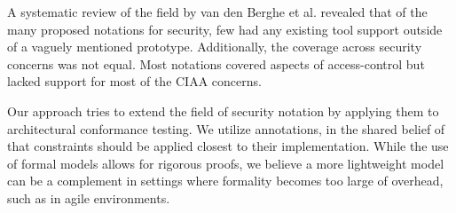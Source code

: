 A systematic review of the field by van den Berghe et al. \cite{vandenberghe_design_2017} revealed that of the many proposed notations for security, few had any existing tool support outside of a vaguely mentioned prototype. Additionally, the coverage across security concerns was not equal. Most notations covered aspects of access-control but lacked support for most of the CIAA concerns. 

Our approach tries to extend the field of security notation by applying them to architectural conformance testing. We utilize annotations, in the shared belief of \cite{sabo_preserving_2009} that constraints should be applied closest to their implementation. While the use of formal models allows for rigorous proofs, we believe a more lightweight model can be a complement in settings where formality becomes too large of overhead, such as in agile environments. 